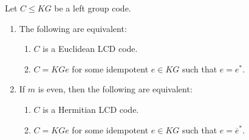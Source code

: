 \documentclass[11pt]{article}
\begin{document}
\begin{corollary}\label{LCD-idempotent}
Let $C\leq KG$ be a left group code.
\begin{enumerate}
    \item The following are equivalent:
    \begin{enumerate}
        \item $C$ is a Euclidean LCD code.
        \item $C=KGe$ for some idempotent $e\in KG$ such that $e=e^\ast$.
    \end{enumerate}

    \item If $m$ is even, then the following are equivalent:
    \begin{enumerate}
        \item $C$ is a Hermitian LCD code.
        \item $C=KGe$ for some idempotent $e\in KG$ such that $e=\overline{e}^\ast$.
    \end{enumerate}
\end{enumerate}
\end{corollary}
\end{document}
